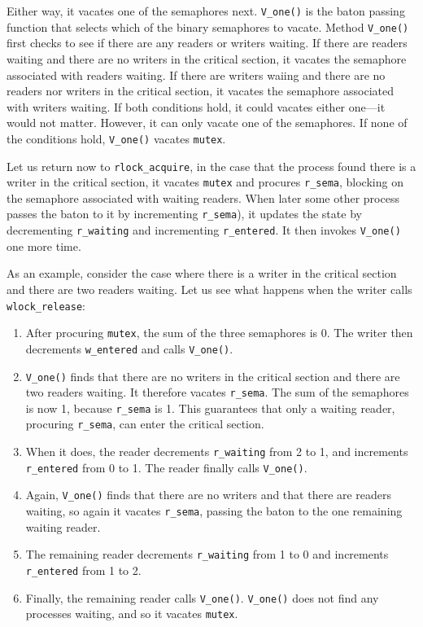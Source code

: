 \documentclass{report}
\begin{document}
Either way, it vacates one of the semaphores next.
\texttt{V\_one()} is the baton passing function that selects which of the
binary semaphores to vacate.
Method \texttt{V\_one()} first checks to see if there are any readers or
writers waiting.  If there are readers waiting and there are no writers
in the critical section, it vacates the semaphore associated with
readers waiting.  If there are writers waiing and there are no readers
nor writers in the critical section, it vacates the semaphore associated
with writers waiting.  If both conditions hold, it could vacates either
one---it would not matter.  However, it can only vacate one of the semaphores.
If none of the conditions hold, \texttt{V\_one()} vacates \texttt{mutex}.

Let us return now to \texttt{rlock\_acquire}, in the case that the process
found there is a writer in the critical section, it vacates
\texttt{mutex} and procures \texttt{r\_sema},
blocking on the semaphore associated
with waiting readers.  When later some other process passes the baton to
it by incrementing \texttt{r\_sema}), it updates the state by decrementing
\texttt{r\_waiting} and incrementing \texttt{r\_entered}.  It
then invokes \texttt{V\_one()} one more time.

As an example, consider the case where there is a writer in the critical
section and there are two readers waiting.  Let us see what happens when
the writer calls \texttt{wlock\_release}:
\begin{enumerate}
\item After procuring \texttt{mutex},
the sum of the three semaphores is 0.  The writer then decrements
\texttt{w\_entered} and calls \texttt{V\_one()}.
\item \texttt{V\_one()} finds that there are no writers in the critical section
and there are two readers waiting.  It therefore vacates \texttt{r\_sema}.
The sum of the semaphores is now 1, because \texttt{r\_sema} is 1.  This
guarantees that only a waiting reader, procuring \texttt{r\_sema}, can enter
the critical section.
\item When it does, the reader decrements \texttt{r\_waiting}
from 2 to 1, and increments \texttt{r\_entered} from 0 to 1.
The reader finally calls \texttt{V\_one()}.
\item Again, \texttt{V\_one()} finds that there are no writers and
that there are readers waiting, so again it vacates \texttt{r\_sema},
passing the baton to the one remaining waiting reader.
\item The remaining reader decrements \texttt{r\_waiting} from 1 to 0 and
increments \texttt{r\_entered} from 1 to 2.
\item Finally, the remaining reader  calls \texttt{V\_one()}.
\texttt{V\_one()} does not find any processes waiting,
and so it vacates \texttt{mutex}.
\end{enumerate}
\end{document}
